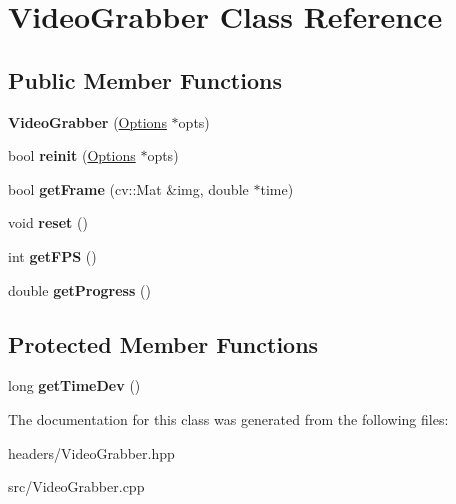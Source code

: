 \hypertarget{classVideoGrabber}{\section{Video\-Grabber Class Reference}
\label{classVideoGrabber}
}
\subsection*{Public Member Functions}
\begin{DoxyCompactItemize}
\item 
\hypertarget{classVideoGrabber_a03ab200fc52862e086f9f2f22173a6f9}{{\bfseries Video\-Grabber} (\hyperlink{structOptions}{Options} $\ast$opts)}\label{classVideoGrabber_a03ab200fc52862e086f9f2f22173a6f9}

\item 
\hypertarget{classVideoGrabber_a3f6df7add151ffb2b073e71527940187}{bool {\bfseries reinit} (\hyperlink{structOptions}{Options} $\ast$opts)}\label{classVideoGrabber_a3f6df7add151ffb2b073e71527940187}

\item 
\hypertarget{classVideoGrabber_a81cc2257449d8c66cd064c140dcd9295}{bool {\bfseries get\-Frame} (cv\-::\-Mat \&img, double $\ast$time)}\label{classVideoGrabber_a81cc2257449d8c66cd064c140dcd9295}

\item 
\hypertarget{classVideoGrabber_a8b32688d649574146f297e6550a502af}{void {\bfseries reset} ()}\label{classVideoGrabber_a8b32688d649574146f297e6550a502af}

\item 
\hypertarget{classVideoGrabber_a45cda38c6cfae4e29fecb069df1da9c0}{int {\bfseries get\-F\-P\-S} ()}\label{classVideoGrabber_a45cda38c6cfae4e29fecb069df1da9c0}

\item 
\hypertarget{classVideoGrabber_a02fa68136ee360e22f82cff82f42d5a4}{double {\bfseries get\-Progress} ()}\label{classVideoGrabber_a02fa68136ee360e22f82cff82f42d5a4}

\end{DoxyCompactItemize}
\subsection*{Protected Member Functions}
\begin{DoxyCompactItemize}
\item 
\hypertarget{classVideoGrabber_aa12db82dbfc5d0d620bbb3082c3d658d}{long {\bfseries get\-Time\-Dev} ()}\label{classVideoGrabber_aa12db82dbfc5d0d620bbb3082c3d658d}

\end{DoxyCompactItemize}


The documentation for this class was generated from the following files\-:\begin{DoxyCompactItemize}
\item 
headers/Video\-Grabber.\-hpp\item 
src/Video\-Grabber.\-cpp\end{DoxyCompactItemize}
